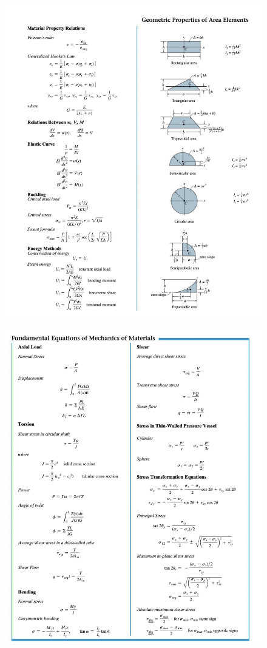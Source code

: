 \begin{figure}
    \centering
    \includegraphics{meunits1.png}
\end{figure}

\begin{figure}
    \centering
    \includegraphics{meunits2.png}
\end{figure}
